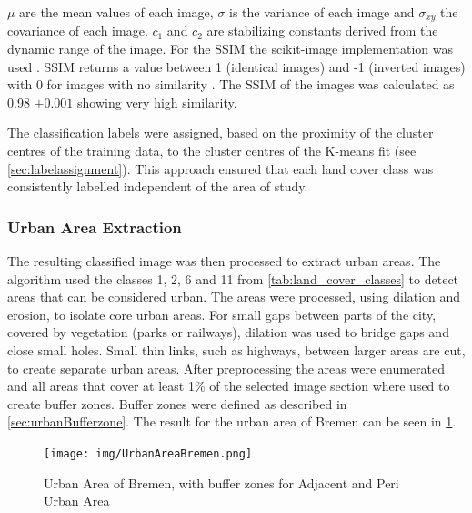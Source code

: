 \documentclass[12pt,a4paper, english,twoside]{scrartcl}
\begin{document}
      $\mu$ are the mean values of each image, $\sigma$ is the variance of each image and $\sigma_{xy}$ the covariance of each image. $c_{1}$ and $c_{2}$ are stabilizing constants derived from the dynamic range of the image\cite[Equation 6]{Wang2003}.
      For the SSIM the scikit-image implementation was used \autocite{Walt2014}.
      \Gls{SSIM} returns a value between 1 (identical images) and -1 (inverted images) with 0 for images with no similarity \autocite{Wang2003}. 
      The \gls{SSIM} of the images was calculated as 0.98 $\pm 0.001$ showing very high similarity.



      \noindent
      The classification labels were assigned, based on the proximity of the cluster centres of the training data, to the cluster centres of the K-means fit (see \cref{sec:labelassignment}).
      This approach ensured that each land cover class was consistently labelled independent of the area of study.
    \subsubsection{Urban Area Extraction}\label{sec:urbanAreaExtraction}
      The resulting classified image was then processed to extract urban areas.
      The algorithm used the classes 1, 2, 6 and 11 from \cref{tab:land_cover_classes} to detect areas that can be considered urban.
      The areas were processed, using \gls{dilation} and \gls{erosion}, to isolate core urban areas. 
      For small gaps between parts of the city, covered by vegetation (parks or railways), dilation was used to bridge gaps and close small holes.
      Small thin links, such as highways, between larger areas are cut, to create separate urban areas.
      After preprocessing the areas were enumerated and all areas that cover at least 1\% of the selected image section where used to create buffer zones. 
      Buffer zones were defined as described in \cref{sec:urbanBufferzone}. 
      The result for the urban area of Bremen can be seen in \cref{fig:bufferedBremen}.\\
      \begin{figure}[!htbp]
        \texttt{[image: img/UrbanAreaBremen.png]}
        \caption{Urban Area of Bremen, with buffer zones for Adjacent and Peri Urban Area\label{fig:bufferedBremen}}
      \end{figure}
      
\end{document}
